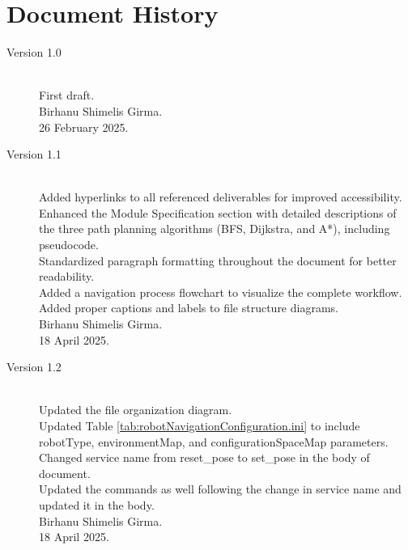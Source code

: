 \documentclass{CSSRforAfrica}
\begin{document}
\newpage
\section*{Document History}
\label{document_history}

\begin{description}
	
	\item [Version 1.0]~\\
	First draft. \\
	Birhanu Shimelis Girma. \\
	26 February 2025.
	
	\item [Version 1.1]~\\
	Added hyperlinks to all referenced deliverables for improved accessibility. \\
	Enhanced the Module Specification section with detailed descriptions of the three path planning algorithms (BFS, Dijkstra, and A*), including pseudocode. \\
	Standardized paragraph formatting throughout the document for better readability. \\
	Added a navigation process flowchart to visualize the complete workflow. \\
	Added proper captions and labels to file structure diagrams. \\
	Birhanu Shimelis Girma. \\
	18 April 2025.
		
	\item [Version 1.2]~\\
	Updated the file organization diagram. \\
	Updated Table \ref{tab:robotNavigationConfiguration.ini} to include robotType, environmentMap, and configurationSpaceMap parameters.\\
	Changed service name from reset\_pose to set\_pose in the body of document. \\
	Updated the commands as well following the change in service name and updated it in the body. \\
	Birhanu Shimelis Girma. \\
	18 April 2025.

\end{description}
\end{document}
